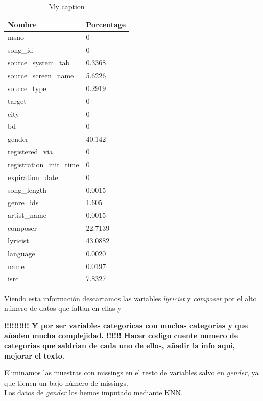 \documentclass[a4paper]{article}
\begin{document}
\begin{table}[H]
\caption{My caption}
\label{my-label}
\begin{tabular}{|l|l|}
\hline
Nombre                   & Porcentage \\ \hline
msno                     & 0          \\ \hline
song\_id                 & 0          \\ \hline
source\_system\_tab      & 0.3368     \\ \hline
source\_screen\_name     & 5.6226     \\ \hline
source\_type             & 0.2919     \\ \hline
target                   & 0          \\ \hline
city                     & 0          \\ \hline
bd                       & 0          \\ \hline
gender                   & 40.142     \\ \hline
registered\_via          & 0          \\ \hline
registration\_init\_time & 0          \\ \hline
expiration\_date         & 0          \\ \hline
song\_length             & 0.0015     \\ \hline
genre\_ids               & 1.605      \\ \hline
artist\_name             & 0.0015     \\ \hline
composer                 & 22.7139    \\ \hline
lyricist                 & 43.0882    \\ \hline
language                 & 0.0020     \\ \hline
name                     & 0.0197     \\ \hline
isrc                     & 7.8327     \\ \hline
\end{tabular}
\end{table}
Viendo esta información descartamos las variables \textit{lyricist} y \textit{composer} por el alto número de datos que faltan en ellas y 

\textbf{!!!!!!!!!! Y por ser variables categoricas con muchas categorias y que añaden mucha complejidad. !!!!!!
Hacer codigo cuente numero de categorias que saldrian de cada uno de ellos, añadir la info aqui, mejorar el texto.
}

Eliminamos las muestras con missings en el resto de variables salvo en \textit{gender}, ya que tienen un bajo número de missings.\\
Los datos de \textit{gender} los hemos imputado mediante KNN.
\end{document}
